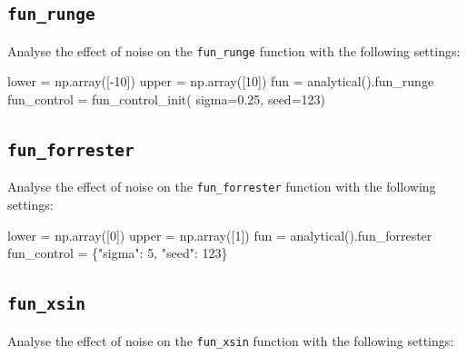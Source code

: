 \documentclass[
  letterpaper,
  DIV=11,
  numbers=noendperiod]{scrreprt}
\newenvironment{Shaded}{\begin{snugshade}}{\end{snugshade}}
\newcommand{\DecValTok}[1]{\textcolor[rgb]{0.68,0.00,0.00}{#1}}
\newcommand{\FloatTok}[1]{\textcolor[rgb]{0.68,0.00,0.00}{#1}}
\newcommand{\NormalTok}[1]{\textcolor[rgb]{0.00,0.23,0.31}{#1}}
\newcommand{\OperatorTok}[1]{\textcolor[rgb]{0.37,0.37,0.37}{#1}}
\newcommand{\StringTok}[1]{\textcolor[rgb]{0.13,0.47,0.30}{#1}}
\begin{document}
\subsection{\texorpdfstring{\texttt{fun\_runge}}{fun\_runge}}\label{fun_runge-1}

Analyse the effect of noise on the \texttt{fun\_runge} function with the
following settings:

\begin{Shaded}
\begin{Highlighting}[]
\NormalTok{lower }\OperatorTok{=}\NormalTok{ np.array([}\OperatorTok{{-}}\DecValTok{10}\NormalTok{])}
\NormalTok{upper }\OperatorTok{=}\NormalTok{ np.array([}\DecValTok{10}\NormalTok{])}
\NormalTok{fun }\OperatorTok{=}\NormalTok{ analytical().fun\_runge}
\NormalTok{fun\_control }\OperatorTok{=}\NormalTok{ fun\_control\_init(    }
\NormalTok{    sigma}\OperatorTok{=}\FloatTok{0.25}\NormalTok{,}
\NormalTok{    seed}\OperatorTok{=}\DecValTok{123}\NormalTok{)}
\end{Highlighting}
\end{Shaded}

\subsection{\texorpdfstring{\texttt{fun\_forrester}}{fun\_forrester}}\label{fun_forrester-1}

Analyse the effect of noise on the \texttt{fun\_forrester} function with
the following settings:

\begin{Shaded}
\begin{Highlighting}[]
\NormalTok{lower }\OperatorTok{=}\NormalTok{ np.array([}\DecValTok{0}\NormalTok{])}
\NormalTok{upper }\OperatorTok{=}\NormalTok{ np.array([}\DecValTok{1}\NormalTok{])}
\NormalTok{fun }\OperatorTok{=}\NormalTok{ analytical().fun\_forrester}
\NormalTok{fun\_control }\OperatorTok{=}\NormalTok{ \{}\StringTok{"sigma"}\NormalTok{: }\DecValTok{5}\NormalTok{,}
               \StringTok{"seed"}\NormalTok{: }\DecValTok{123}\NormalTok{\}}
\end{Highlighting}
\end{Shaded}

\subsection{\texorpdfstring{\texttt{fun\_xsin}}{fun\_xsin}}\label{fun_xsin-1}

Analyse the effect of noise on the \texttt{fun\_xsin} function with the
following settings:
\end{document}
